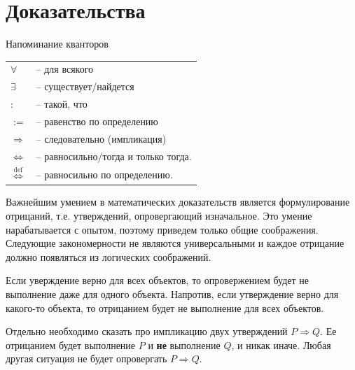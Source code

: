 \section{Доказательства}
Напоминание кванторов
\begin{center}
\begin{tabular}{l l}
$\forall$ & -- для всякого\\
$\exists$ & -- существует/найдется \\
: & -- такой, что \\
$:=$ & -- равенство по определению \\
$\Rightarrow$ & -- следовательно (импликация)\\
$\iff$ & -- равносильно/тогда и только тогда.\\
$\overset{\mathrm{def}}{\iff}$ & -- равносильно по определению.
\end{tabular}
\end{center}
Важнейшим умением в математических доказательств является формулирование отрицаний, т.е. утверждений, опровергающий изначальное. Это умение нарабатывается с опытом, поэтому приведем только общие соображения. Следующие закономерности не являются универсальными и каждое отрицание должно появляться из логических соображений.

Если уверждение верно для всех объектов, то опровержением будет не выполнение даже для одного объекта. Напротив, если утверждение верно для какого-то объекта, то отрицанием будет не выполнение для всех объектов.

Отдельно необходимо сказать про импликацию двух утверждений $P\Rightarrow Q$. Ее отрицанием будет выполнение $P$ и \textbf{не} выполнение $Q$, и никак иначе. Любая другая ситуация не будет опровергать $P\Rightarrow Q$.

